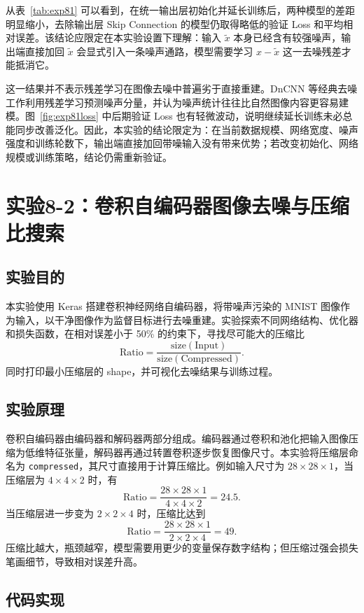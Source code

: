 \documentclass[10.5pt]{config}
\begin{document}
从表~\ref{tab:exp81} 可以看到，在统一输出层初始化并延长训练后，两种模型的差距明显缩小，去除输出层 Skip Connection 的模型仍取得略低的验证 Loss 和平均相对误差。该结论应限定在本实验设置下理解：输入 $\tilde{x}$ 本身已经含有较强噪声，输出端直接加回 $\tilde{x}$ 会显式引入一条噪声通路，模型需要学习 $x-\tilde{x}$ 这一去噪残差才能抵消它。

这一结果并不表示残差学习在图像去噪中普遍劣于直接重建。DnCNN 等经典去噪工作利用残差学习预测噪声分量，并认为噪声统计往往比自然图像内容更容易建模。图~\ref{fig:exp81loss} 中后期验证 Loss 也有轻微波动，说明继续延长训练未必总能同步改善泛化。因此，本实验的结论限定为：在当前数据规模、网络宽度、噪声强度和训练轮数下，输出端直接加回带噪输入没有带来优势；若改变初始化、网络规模或训练策略，结论仍需重新验证。

\section{实验8-2：卷积自编码器图像去噪与压缩比搜索}

\subsection{实验目的}

本实验使用 Keras 搭建卷积神经网络自编码器，将带噪声污染的 MNIST 图像作为输入，以干净图像作为监督目标进行去噪重建。实验探索不同网络结构、优化器和损失函数，在相对误差小于 50\% 的约束下，寻找尽可能大的压缩比
\[
    \mathrm{Ratio}=\frac{\mathrm{size(Input)}}{\mathrm{size(Compressed)}} .
\]
同时打印最小压缩层的 shape，并可视化去噪结果与训练过程。

\subsection{实验原理}

卷积自编码器由编码器和解码器两部分组成。编码器通过卷积和池化把输入图像压缩为低维特征张量，解码器再通过转置卷积逐步恢复图像尺寸。本实验将压缩层命名为 \texttt{compressed}，其尺寸直接用于计算压缩比。例如输入尺寸为 $28\times28\times1$，当压缩层为 $4\times4\times2$ 时，有
\[
    \mathrm{Ratio}=\frac{28\times28\times1}{4\times4\times2}=24.5 .
\]
当压缩层进一步变为 $2\times2\times4$ 时，压缩比达到
\[
    \mathrm{Ratio}=\frac{28\times28\times1}{2\times2\times4}=49 .
\]
压缩比越大，瓶颈越窄，模型需要用更少的变量保存数字结构；但压缩过强会损失笔画细节，导致相对误差升高。

\subsection{代码实现}
\end{document}
